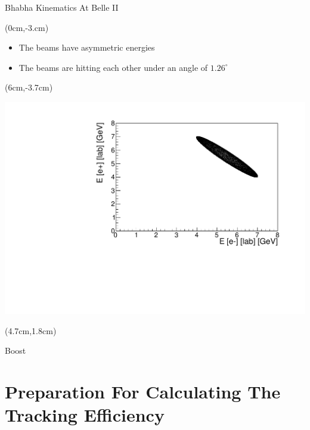 \documentclass[8pt]{beamer}
\begin{document}
\begin{frame}{Bhabha Kinematics At Belle II}
	\begin{textblock*}{5cm}(0cm,-3.cm)
		\begin{itemize}
			\item The beams have asymmetric energies
			\item The beams are hitting each other under an angle of $1.26^{\circ}$
		\end{itemize}
	\end{textblock*}

\begin{textblock*}{5.5cm}(6cm,-3.7cm)
	
	\includegraphics[width=\textwidth]{VBilder/ee}
\end{textblock*}





\begin{textblock*}{2cm}(4.7cm,1.8cm)

	\centering
	Boost
\end{textblock*}
	
	
\end{frame}





\section{Preparation For Calculating The Tracking Efficiency}
\end{document}
